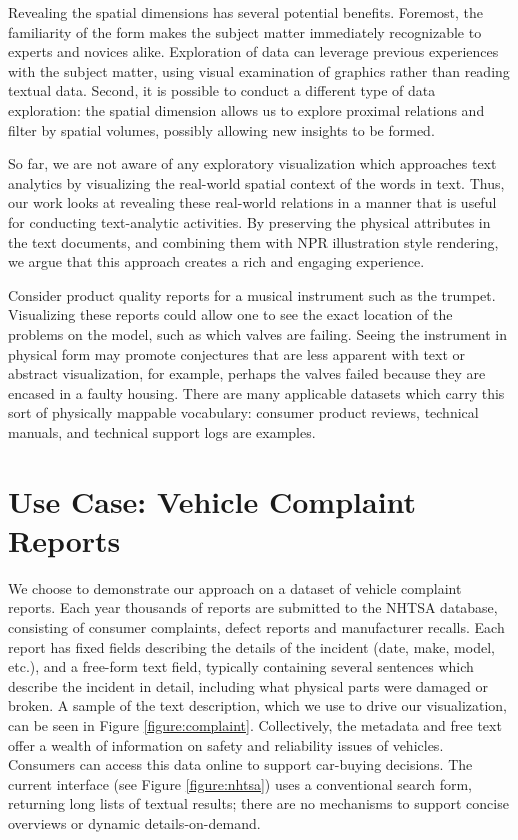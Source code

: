 Revealing the spatial dimensions has several potential benefits. Foremost, the
familiarity of the form makes the subject matter immediately recognizable
to experts and novices alike. Exploration of data can leverage previous 
experiences with the subject matter, using visual examination of graphics 
rather than reading textual data. Second, it is possible to conduct a different
type of data exploration: the spatial dimension allows us to explore
proximal relations and filter by spatial volumes, possibly allowing
new insights to be formed.

So far, we are not aware of any exploratory visualization which approaches text
analytics by visualizing the real-world spatial context of the words in
text. Thus, our work looks at revealing these real-world relations in a manner
that is useful for conducting text-analytic activities. By preserving the physical
attributes in the text documents, and combining them with NPR illustration style 
rendering, we argue that this approach creates a rich and engaging experience.

Consider product quality reports for a musical instrument such as the trumpet.
Visualizing these reports could allow one to see the exact location of the problems on the
\threed model, such as which valves are failing. Seeing the instrument
in physical form may promote conjectures that are less apparent
with text or abstract visualization, for example, perhaps the valves
failed because they are encased in a faulty housing. There are many
applicable datasets which carry this sort of physically mappable vocabulary:
consumer product reviews, technical manuals, and technical
support logs are examples.
 


\section{Use Case: Vehicle Complaint Reports}
We choose to demonstrate our approach on a dataset of vehicle complaint
reports. Each year thousands of reports are submitted to the
NHTSA database, consisting of consumer complaints, defect reports
and manufacturer recalls. Each report has fixed fields describing the
details of the incident (date, make, model, etc.), and a free-form text
field, typically containing several sentences which describe the incident
in detail, including what physical parts were damaged or broken. A sample of the
text description, which we use to drive our visualization, can be seen in Figure
\ref{figure:complaint}.  Collectively, the metadata and free
text offer a wealth of information on safety and reliability issues of
vehicles. Consumers can access this data online to support car-buying
decisions. The current interface (see Figure \ref{figure:nhtsa}) uses a
conventional search form, returning long lists of textual results; there are no mechanisms to support
concise overviews or dynamic details-on-demand. 

